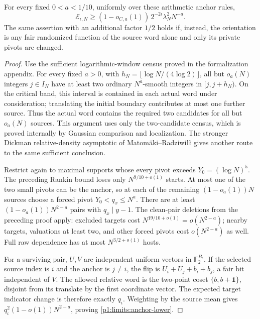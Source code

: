 \begin{proposition}
\label{p1:limits:all-anchors}
For every fixed $0<a<1/10$, uniformly over these arithmetic
anchor rules,
\begin{equation}
 \mathcal E_{\iota,N}\ge
       (1-o_{C,a}(1))\,2^{-2\iota}\lambda_N^2N^{-a}.
 \label{p1:limits:anchor-lower}
\end{equation}
The same assertion with an additional factor $1/2$ holds
if, instead, the orientation is any fair randomized
function of the source word alone and only its private
pivots are changed.
\end{proposition}
\begin{proof}
Use the sufficient logarithmic-window census proved in the
formalization appendix.  For every fixed $a>0$, with
$h_N=\lfloor\log N/(4\log2)\rfloor$, all but $o_a(N)$ integers
$j\in I_N$ have at least two ordinary $N^a$-smooth integers in
$[j,j+h_N)$.  On the critical band, this interval is contained
in each actual word under consideration; translating the initial
boundary contributes at most one further source.
Thus the actual word contains the required two candidates for all
but $o_a(N)$ sources.  This argument uses only the two-candidate
census, which is proved internally by Gaussian comparison and
localization.  The stronger Dickman relative-density asymptotic
of Matom\"aki--Radziwi{\l}{\l}
\cite[Corollary~6]{matomakiradziwill2016} gives another route to
the same sufficient conclusion.

Restrict again to maximal supports whose every pivot
exceeds $Y_0=(\log N)^5$.  The preceding Rankin bound
loses only $N^{9/10+o(1)}$ starts.  At most one of the
two small pivots can be the anchor, so at each of the
remaining $(1-o_a(1))N$ sources choose a forced pivot
$Y_0<q_x\le N^a$.  There are at least
$(1-o_a(1))N^{2-a}$ pairs with $q_x\mid y-1$.
The clean-pair deletions from the preceding proof apply:
excluded targets cost $N^{19/10+o(1)}=o(N^{2-a})$;
nearby targets, valuations at least two, and other forced
pivots cost $o(N^{2-a})$ as well.  Full raw dependence
has at most $N^{3/2+o(1)}$ hosts.

For a surviving pair, $U,V$ are independent uniform
vectors in $\mathbb F_2^{B_\iota}$.  If the selected
source index is $i$ and the anchor is $j\ne i$, the flip
is $U_i+U_j+b_i+b_j$, a fair bit independent of $V$.
The allowed relative word is the two-point coset
$\{b,b+\boldsymbol1\}$, disjoint from its translate by
the first coordinate vector.  The expected target
indicator change is therefore exactly $q_\iota$.
Weighting by the source mean gives
$q_\iota^2(1-o(1))N^{2-a}$, proving
\eqref{p1:limits:anchor-lower}.


\end{proof}
